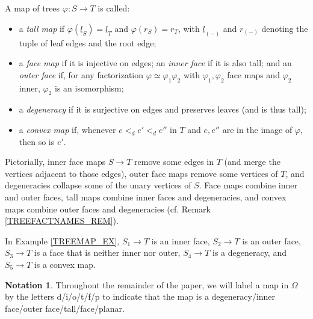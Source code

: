 \documentclass{hha}
\theoremstyle{definition} %
\newtheorem{notation}[theorem]{Notation}%
\begin{document}
\begin{definition}
        \label{TREEMAP_DEF}
        A map of trees $\varphi \colon S \to T$ is called:
        \begin{itemize}
        \item a \textit{tall map} if
                $\varphi(\underline{l}_S) = \underline{l}_T$ and $\varphi(r_S) = r_T$,
                with $\underline{l}_{(-)}$ and $r_{(-)}$ denoting the tuple of leaf edges and the root edge;
        \item a \textit{face map} if it is injective on edges;
                an \textit{inner face} if it is also tall; and
                an \textit{outer face} if, for any factorization
                $\varphi \simeq \varphi_1\varphi_2$
                with $\varphi_1,\varphi_2$ face maps
                and $\varphi_2$ inner, 
                $\varphi_2$ is an isomorphism;
        \item a \textit{degeneracy} if it is surjective on edges and preserves leaves
                (and is thus tall);
        \item a \textit{convex map} if,
        	whenever $e <_d e' <_d e''$ in $T$ 
        	and $e,e''$ are in the image of $\varphi$,
        	then so is $e'$.
        \end{itemize}
\end{definition}

Pictorially, inner face maps 
$S \to T$ remove some edges in $T$
(and merge the vertices adjacent to those edges),
outer face maps remove some vertices of $T$,
and degeneracies collapse some of the unary vertices of $S$.
Face maps combine inner and outer faces,
tall maps combine inner faces and degeneracies, 
and convex maps combine outer faces and degeneracies (cf. Remark \ref{TREEFACTNAMES_REM}).


\begin{example}
	In Example \ref{TREEMAP_EX},
	$S_1 \to T$ is an inner face,
	$S_2 \to T$ is an outer face,
	$S_3 \to T$ is a face that is neither inner nor outer,
	$S_4 \to T$ is a degeneracy,
	and $S_5 \to T$ is a convex map.
\end{example}


\begin{notation}\label{MAPLABELS_NOT}
	Throughout the remainder of the paper,
        we will label a 
        map in $\Omega$
        by the letters d/i/o/t/f/p
        to indicate that the map is
        a degeneracy/inner face/outer face/tall/face/planar.
\end{notation}
\end{document}
